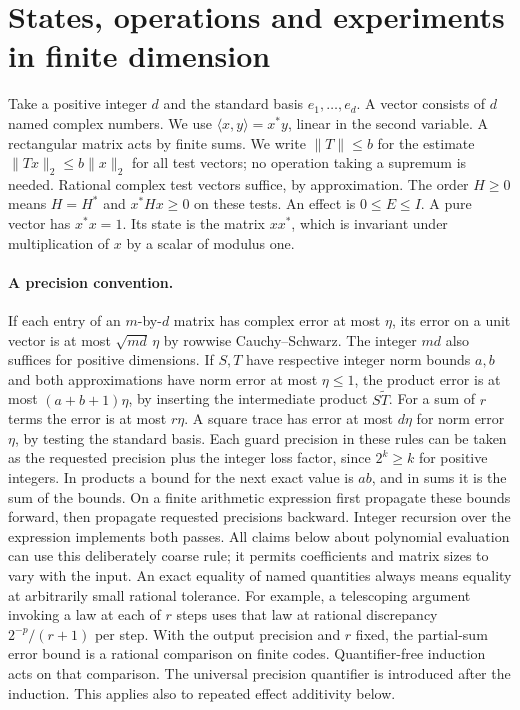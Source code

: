 \section{States, operations and experiments in finite dimension}
\label{sec:finite-quantum}

Take a positive integer \(d\) and the standard basis \(e_1,\ldots,e_d\).
A vector consists of \(d\) named complex numbers. We use
\(\langle x,y\rangle=x^*y\), linear in the second variable. A rectangular
matrix acts by finite sums. We write \(\|T\|\le b\) for the estimate
\(\|Tx\|_2\le b\|x\|_2\) for all test vectors; no operation taking a
supremum is needed. Rational complex test vectors suffice, by approximation.
The order \(H\ge0\) means \(H=H^*\) and \(x^*Hx\ge0\) on these tests.
An effect is \(0\le E\le I\). A pure vector has \(x^*x=1\). Its state is
the matrix \(xx^*\), which is invariant under multiplication of \(x\) by a
scalar of modulus one.

\paragraph{A precision convention.}
If each entry of an \(m\)-by-\(d\) matrix has complex error at most
\(\eta\), its error on a unit vector is at most \(\sqrt{md}\,\eta\)
by rowwise Cauchy--Schwarz. The integer \(md\) also suffices for positive
dimensions. If \(S,T\) have respective integer norm bounds \(a,b\) and
both approximations have norm error at most \(\eta\le1\), the product
error is at most \((a+b+1)\eta\), by inserting the intermediate product
\(S\widetilde T\). For a sum of \(r\) terms the error is at most
\(r\eta\). A square trace has error at most \(d\eta\) for norm error
\(\eta\), by testing the standard basis. Each guard precision in these
rules can be taken as the requested precision plus the integer loss factor,
since \(2^k\ge k\) for positive integers. In products a bound for the
next exact value is \(ab\), and in sums it is the sum of the bounds.
On a finite arithmetic expression first propagate these bounds forward,
then propagate requested precisions backward. Integer recursion over the
expression implements both passes. All claims below about polynomial
evaluation can use this deliberately coarse rule; it permits coefficients
and matrix sizes to vary with the input. An exact equality of named
quantities always means equality at arbitrarily small rational tolerance.
For example, a telescoping argument invoking a law at each of \(r\) steps
uses that law at rational discrepancy \(2^{-p}/(r+1)\) per step.
With the output precision and \(r\) fixed, the partial-sum error bound
is a rational comparison on finite codes. Quantifier-free induction acts
on that comparison. The universal precision quantifier is introduced after
the induction. This applies also to repeated effect additivity below.

